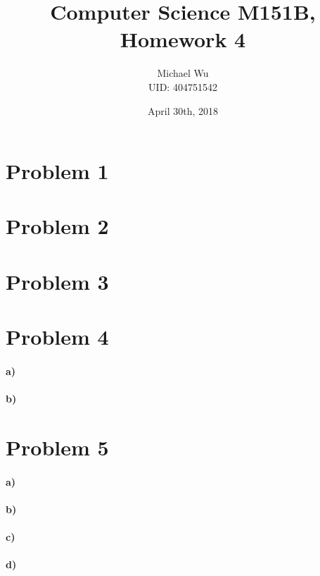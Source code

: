 \documentclass[12pt]{article}
\begin{document}
\title{Computer Science M151B, Homework 4}
\date{April 30th, 2018}
\author{Michael Wu\\UID: 404751542}
\maketitle

\section*{Problem 1}

\section*{Problem 2}

\section*{Problem 3}

\section*{Problem 4}

\paragraph{a)}

\paragraph{b)}

\section*{Problem 5}

\paragraph{a)}

\paragraph{b)}

\paragraph{c)}

\paragraph{d)}
\end{document}
